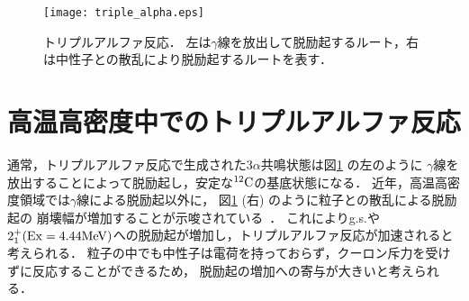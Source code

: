 \documentclass[../master]{subfiles}
\begin{document}
\begin{figure}
  \centering
  \texttt{[image: triple\_alpha.eps]}
  \caption[トリプルアルファ反応．]{トリプルアルファ反応．
    左は$\gamma$線を放出して脱励起するルート，右は中性子との散乱により脱励起するルートを表す．}
  \label{fig::triple_alpha}
\end{figure}

\section{高温高密度中でのトリプルアルファ反応}
\label{seq::triplealphareaction}
通常，トリプルアルファ反応で生成された$3\alpha$共鳴状態は図\ref{fig::triple_alpha} の左のように
$\gamma$線を放出することによって脱励起し，安定な${}^{12}{\rm C}$の基底状態になる．
近年，高温高密度領域では$\gamma$線による脱励起以外に，
図\ref{fig::triple_alpha} (右) のように粒子との散乱による脱励起の
崩壊幅が増加することが示唆されている~\cite{hotdensemedium}．
これによりg.s.や$2_{1}^{+} ({\rm Ex} = 4.44 {\rm MeV}) $への脱励起が増加し，トリプルアルファ反応が加速されると考えられる．
粒子の中でも中性子は電荷を持っておらず，クーロン斥力を受けずに反応することができるため，
脱励起の増加への寄与が大きいと考えられる．


\end{document}
